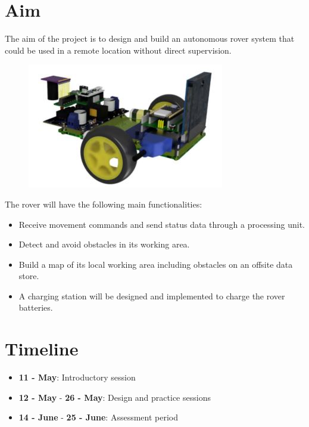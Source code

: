 \documentclass[10pt, a4paper]{article}
\begin{document}
\section{Aim}

The aim of the project is to design and build an autonomous rover system that could be used in a remote location without direct supervision. 

\begin{figure} [h!]
    \centering
    \includegraphics[scale=0.8]{Rover.JPG}
\end{figure}

The rover will have the following main functionalities:
\begin{itemize}
    \item Receive movement commands and send status data through a processing unit.
    \item Detect and avoid obstacles in its working area.
    \item Build a map of its local working area including obstacles on an offsite data store.
    \item A charging station will be designed and implemented to charge the rover batteries.
\end{itemize}

\section{Timeline}

\begin{itemize}
    \item \textbf{11 - May}: Introductory session
    \item \textbf{12 - May} - \textbf{26 - May}: Design and practice sessions 
    \item \textbf{14 - June} - \textbf{25 - June}: Assessment period 
\end{itemize}
\end{document}

